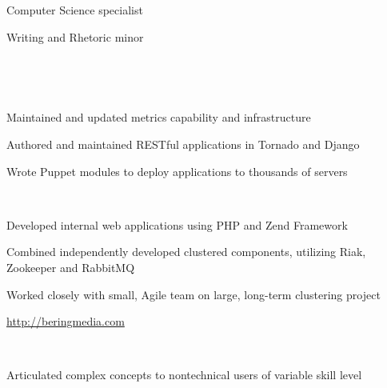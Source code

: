 \documentclass[letterpaper,11pt,notitlepage]{article}
\begin{document}

\vbar
{}
    \begin{employment}
        \item Computer Science specialist
        \item Writing and Rhetoric minor
    \end{employment}
    \\

\vbar
{}
         \\
        \begin{employment}
            \item Maintained and updated metrics capability and infrastructure
            \item Authored and maintained RESTful applications in Tornado and Django
            \item Wrote Puppet modules to deploy applications to thousands of servers
        \end{employment}
         \\
        \begin{employment}
            \item Developed internal web applications using PHP and Zend
            Framework
            \item Combined independently developed clustered components,
            utilizing Riak, Zookeeper and RabbitMQ
            \item Worked closely with small, Agile team on large, long-term
            clustering project
            \item \url{http://beringmedia.com}
        \end{employment}
         \\
        \begin{employment}
            \item Articulated complex concepts to nontechnical users of variable skill level
        \end{employment}
\end{document}
